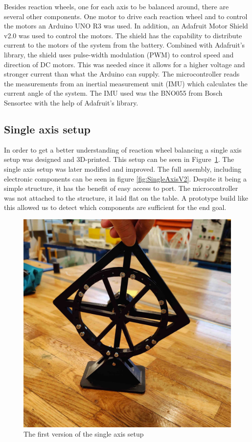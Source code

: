 Besides reaction wheels, one for each axis to be balanced around,  there are several other components. One motor to drive each reaction wheel and to control the motors an Arduino UNO R3\cite{arduino} was used. In addition, an Adafruit Motor Shield v2.0\cite{motorshield} was used to control the motors. The shield has the capability to distribute current to the motors of the system from the battery. Combined with Adafruit's library\cite{ms-lib}, the shield uses pulse-width modulation (PWM) to control speed and direction of DC motors. This was needed since it allows for a higher voltage and stronger current than what the Arduino can supply. The microcontroller reads the measurements from an inertial measurement unit (IMU) which calculates the current angle of the system. The IMU used was the BNO055 from Bosch Sensortec\cite{IMU-datasheet} with the help of Adafruit's library\cite{IMU-lib}.

\subsection{Single axis setup}
In order to get a better understanding of reaction wheel balancing a single axis setup was designed and 3D-printed. This setup can be seen in Figure~\ref{fig:SingleAxisV1}. The single axis setup was later modified and improved. The full assembly, including electronic components can be seen in figure \ref{fig:SingleAxisV2}. Despite it being a simple structure, it has the benefit of easy access to port. The microcontroller was not attached to the structure, it laid flat on the table. A prototype build like this allowed us to detect which components are sufficient for the end goal.

\begin{figure}
    \centering
    \includegraphics[width=0.6\linewidth]{figures/SingleAxisV1.jpg}
    \caption{The first version of the single axis setup}
    \label{fig:SingleAxisV1}
\end{figure}

